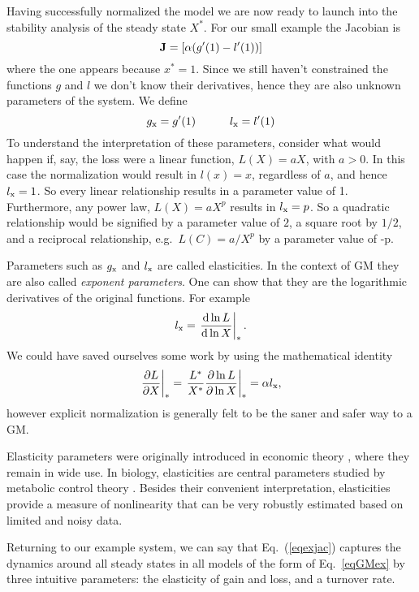 \documentclass{article}
\newcommand{\eq}[1]{\begin{equation}#1\end{equation}}
\begin{document}
Having successfully normalized the model we are now ready to launch into the stability analysis of the steady state $X^*$. For our small example the Jacobian is 
\eq{
\label{eqexjac}
{\bf J} = \left[ \alpha (  g'(1) - l'(1) )    \right]
}
where the one appears because $x^*=1$. Since we still haven't constrained the functions $g$ and $l$ we don't know their derivatives, hence they are also unknown parameters of the system. We define
\eq{
g_{\rm x}=g'(1) \quad\quad\quad l_{\rm x}=l'(1)
}
To understand the interpretation of these parameters, consider what would happen if, say, the loss were a linear function, $L(X)=aX$, with $a>0$. In this case the normalization would result in $l(x)=x$, regardless of $a$, and hence $l_{\rm x}=1$. So every linear relationship results in a parameter value of 1. Furthermore, any power law, $L(X)=aX^p$ results in $l_{\rm x}=p$. So a quadratic relationship would be signified by a parameter value of $2$, a square root by $1/2$, and a reciprocal relationship, e.g.~$L(C)=a/X^p$ by a parameter value of -p. 

Parameters such as $g_{\rm x}$ and $l_{\rm x}$ are called elasticities. In the context of GM they are also called \emph{exponent parameters}. One can show that they are the logarithmic derivatives of the original functions. For example 
\eq{
l_{\rm x} = \left.\frac{{\rm d}\ln L }{{\rm d}\ln X }\right|_*.
}
We could have saved ourselves some work by using the mathematical identity
\eq{
\left.\frac{\partial L}{\partial X}\right|_* = \left.\frac{L^*}{X^*} \frac{\partial \ln L}{\partial \ln X } \right|_* = \alpha l_{\rm x},
}
however explicit normalization is generally felt to be the saner and safer way to a GM.

Elasticity parameters were originally introduced in economic theory
\citep{reilly1940use}, where they remain in wide use. In biology, elasticities are central parameters studied by metabolic control theory \citep{fell1985metabolic}. Besides their convenient interpretation, elasticities provide a measure of nonlinearity that can be very robustly estimated based on limited and noisy data. 

Returning to our example system, we can say that Eq.~(\ref{eqexjac}) captures the dynamics around all steady states in all models of the form of Eq.~\ref{eqGMex} by three intuitive parameters: the elasticity of gain and loss, and a turnover rate. 
\end{document}
